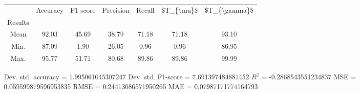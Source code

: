 \begin{tabular}{|c|c|c|c|c|c|c|}
\toprule
{} &  Accuracy &  F1 score &  Precision &  Recall &  \$T\_\{\textbackslash mu\}\$ &  \$T\_\{\textbackslash gamma\}\$ \\
Results &           &           &            &         &            &               \\
\hline
Mean    &     92.03 &     45.69 &      38.79 &   71.18 &      71.18 &         93.10 \\
Min.    &     87.09 &      1.90 &      26.05 &    0.96 &       0.96 &         86.95 \\
Max.    &     95.77 &     51.71 &      80.68 &   89.86 &      89.86 &         99.99 \\
\bottomrule
\end{tabular}

 Dev. std. accuracy = 1.995061045307247
 Dev. std. F1-score = 7.691397484881452
 $R^2$ = -0.2868543551234837
 MSE = 0.059599879596953835
 RMSE = 0.24413086571950265
 MAE = 0.07987171774164793
